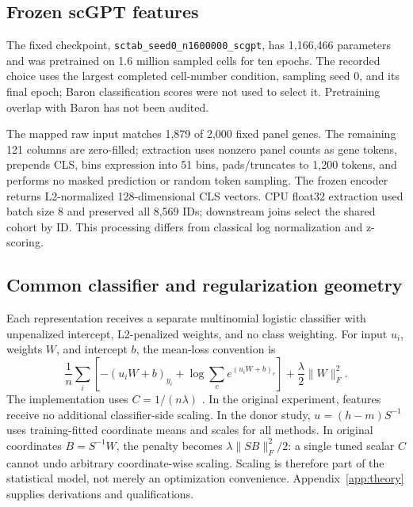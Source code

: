 \subsection{Frozen scGPT features}
The fixed checkpoint, \texttt{sctab\_seed0\_n1600000\_scgpt}, has 1,166,466
parameters and was pretrained on 1.6 million sampled cells for ten epochs.
The recorded choice uses the largest completed cell-number condition,
sampling seed 0, and its final epoch; Baron classification scores were not
used to select it. Pretraining overlap with Baron has not been audited.

The mapped raw input matches 1,879 of 2,000 fixed panel genes. The remaining
121 columns are zero-filled; extraction uses nonzero panel counts as gene
tokens, prepends CLS, bins expression into 51 bins, pads/truncates to 1,200 tokens, and performs
no masked prediction or random token sampling. The frozen encoder returns L2-normalized
128-dimensional CLS vectors. CPU float32 extraction used batch size 8 and
preserved all 8,569 IDs; downstream joins select the shared cohort by ID.
This processing differs from classical log normalization and z-scoring.

\subsection{Common classifier and regularization geometry}
Each representation receives a separate multinomial logistic classifier with
unpenalized intercept, L2-penalized weights, and no class weighting. For input
$u_i$, weights $W$, and intercept $b$, the mean-loss convention is
\begin{equation}
 \frac1n\sum_i\left[-(u_iW+b)_{y_i}+\log\sum_c e^{(u_iW+b)_c}\right]
       +\frac{\lambda}{2}\|W\|_F^2.\label{eq:logit}
\end{equation}
The implementation uses $C=1/(n\lambda)$ \cite{sklearn}. In the original
experiment, features receive no additional classifier-side scaling. In the
donor study, $u=(h-m)S^{-1}$ uses training-fitted coordinate means and scales
for all methods. In original coordinates $B=S^{-1}W$, the penalty becomes
$\lambda\|SB\|_F^2/2$: a single tuned scalar $C$ cannot undo arbitrary
coordinate-wise scaling. Scaling is therefore part of the statistical model,
not merely an optimization convenience. Appendix~\ref{app:theory} supplies
derivations and qualifications.
